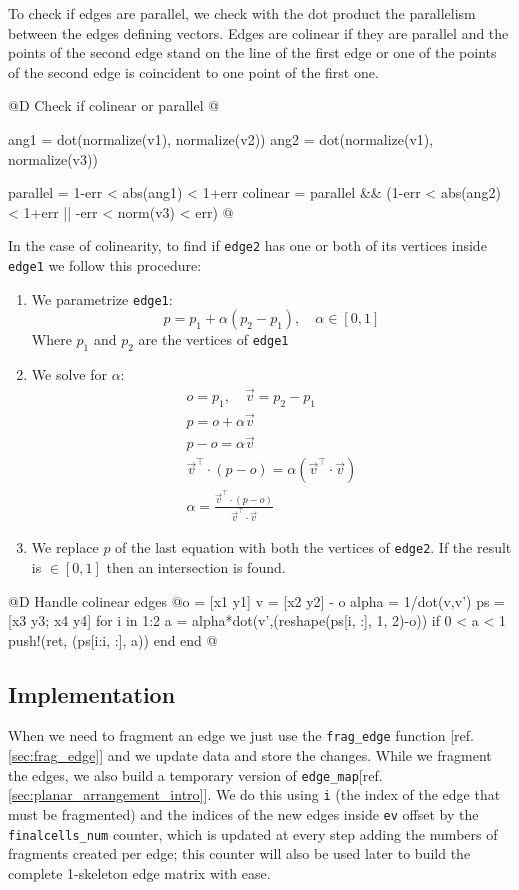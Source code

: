 To check if edges are parallel, we check with the dot product 
the parallelism between the edges defining vectors.
Edges are colinear if they are parallel and the points of
the second edge stand on the line of the first edge
or one of the points of the second edge is coincident to
one point of the first one.

@D Check if colinear or parallel
@{ang1 = dot(normalize(v1), normalize(v2))
ang2 = dot(normalize(v1), normalize(v3))

parallel = 1-err < abs(ang1) < 1+err
colinear = parallel && (1-err < abs(ang2) < 1+err || -err < norm(v3) < err)
@}

In the case of colinearity, 
to find if \texttt{edge2} has one or both of 
its vertices inside \texttt{edge1} we follow this procedure:
\begin{enumerate}
\item We parametrize \texttt{edge1}:
\[
    p = p_1 + \alpha(p_2-p_1), \quad\alpha\in[0, 1]
\]
Where $p_1$ and $p_2$ are the vertices of \texttt{edge1}
\item We solve for $\alpha$:
\begin{gather*}
    o = p_1, \quad\vec{v} = p_2 - p_1 \\
    p = o + \alpha\vec{v} \\
    p - o = \alpha\vec{v} \\
    \vec{v}^\top\cdot(p-o) = \alpha (\vec{v}^\top\cdot\vec{v}) \\
    \alpha = \frac{\vec{v}^\top\cdot(p-o)}{\vec{v}^\top\cdot\vec{v}}
\end{gather*}
\item We replace $p$ of the last equation with both the vertices of \texttt{edge2}.
If the result is $\in[0,1]$ then an intersection is found.
\end{enumerate} 
@D Handle colinear edges
@{o = [x1 y1] 
v = [x2 y2] - o
alpha = 1/dot(v,v')
ps = [x3 y3; x4 y4]
for i in 1:2
    a = alpha*dot(v',(reshape(ps[i, :], 1, 2)-o))
    if 0 < a < 1
        push!(ret, (ps[i:i, :], a))
    end
end
@}
\subsection{Implementation}

When we need to fragment an edge we just use the \texttt{frag\_edge} function [ref. \ref{sec:frag_edge}]
and we update data and store the changes.
While we fragment the edges, we also build a temporary version of \texttt{edge\_map}[ref. \ref{sec:planar_arrangement_intro}]. We do this using \texttt{i}
(the index of the edge that must be fragmented) and the indices of the new edges inside \texttt{ev}
offset by the \texttt{finalcells\_num} counter, which is updated at every step adding the numbers of
fragments created per edge; this counter will also be used later to build the complete 1-skeleton 
edge matrix with ease.

